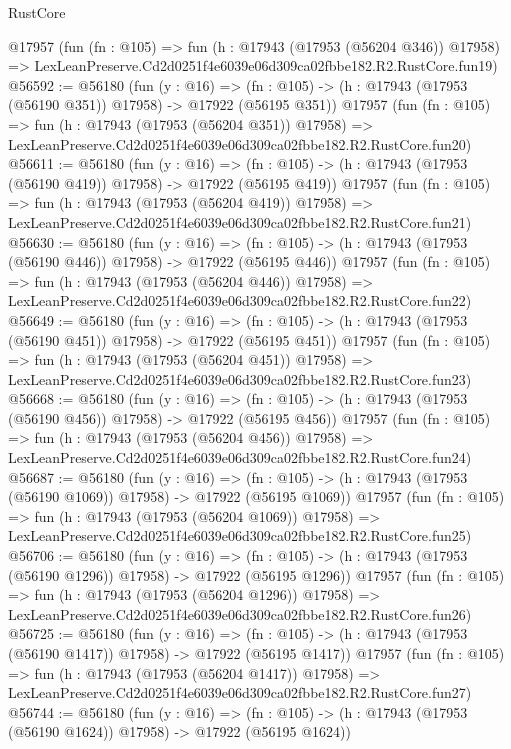 \begin{lexlean}{RustCore}
\begin{coremodule}
    @17957
    (fun (fn : @105) =>
    fun (h : @17943 (@17953 (@56204 @346)) @17958) =>
    LexLeanPreserve.Cd2d0251f4e6039e06d309ca02fbbe182.R2.RustCore.fun19)
@56592 := @56180
    (fun (y : @16) =>
    (fn : @105) -> (h : @17943 (@17953 (@56190 @351)) @17958) -> @17922 (@56195 @351))
    @17957
    (fun (fn : @105) =>
    fun (h : @17943 (@17953 (@56204 @351)) @17958) =>
    LexLeanPreserve.Cd2d0251f4e6039e06d309ca02fbbe182.R2.RustCore.fun20)
@56611 := @56180
    (fun (y : @16) =>
    (fn : @105) -> (h : @17943 (@17953 (@56190 @419)) @17958) -> @17922 (@56195 @419))
    @17957
    (fun (fn : @105) =>
    fun (h : @17943 (@17953 (@56204 @419)) @17958) =>
    LexLeanPreserve.Cd2d0251f4e6039e06d309ca02fbbe182.R2.RustCore.fun21)
@56630 := @56180
    (fun (y : @16) =>
    (fn : @105) -> (h : @17943 (@17953 (@56190 @446)) @17958) -> @17922 (@56195 @446))
    @17957
    (fun (fn : @105) =>
    fun (h : @17943 (@17953 (@56204 @446)) @17958) =>
    LexLeanPreserve.Cd2d0251f4e6039e06d309ca02fbbe182.R2.RustCore.fun22)
@56649 := @56180
    (fun (y : @16) =>
    (fn : @105) -> (h : @17943 (@17953 (@56190 @451)) @17958) -> @17922 (@56195 @451))
    @17957
    (fun (fn : @105) =>
    fun (h : @17943 (@17953 (@56204 @451)) @17958) =>
    LexLeanPreserve.Cd2d0251f4e6039e06d309ca02fbbe182.R2.RustCore.fun23)
@56668 := @56180
    (fun (y : @16) =>
    (fn : @105) -> (h : @17943 (@17953 (@56190 @456)) @17958) -> @17922 (@56195 @456))
    @17957
    (fun (fn : @105) =>
    fun (h : @17943 (@17953 (@56204 @456)) @17958) =>
    LexLeanPreserve.Cd2d0251f4e6039e06d309ca02fbbe182.R2.RustCore.fun24)
@56687 := @56180
    (fun (y : @16) =>
    (fn : @105) -> (h : @17943 (@17953 (@56190 @1069)) @17958) -> @17922 (@56195 @1069))
    @17957
    (fun (fn : @105) =>
    fun (h : @17943 (@17953 (@56204 @1069)) @17958) =>
    LexLeanPreserve.Cd2d0251f4e6039e06d309ca02fbbe182.R2.RustCore.fun25)
@56706 := @56180
    (fun (y : @16) =>
    (fn : @105) -> (h : @17943 (@17953 (@56190 @1296)) @17958) -> @17922 (@56195 @1296))
    @17957
    (fun (fn : @105) =>
    fun (h : @17943 (@17953 (@56204 @1296)) @17958) =>
    LexLeanPreserve.Cd2d0251f4e6039e06d309ca02fbbe182.R2.RustCore.fun26)
@56725 := @56180
    (fun (y : @16) =>
    (fn : @105) -> (h : @17943 (@17953 (@56190 @1417)) @17958) -> @17922 (@56195 @1417))
    @17957
    (fun (fn : @105) =>
    fun (h : @17943 (@17953 (@56204 @1417)) @17958) =>
    LexLeanPreserve.Cd2d0251f4e6039e06d309ca02fbbe182.R2.RustCore.fun27)
@56744 := @56180
    (fun (y : @16) =>
    (fn : @105) -> (h : @17943 (@17953 (@56190 @1624)) @17958) -> @17922 (@56195 @1624))

\end{coremodule}
\end{lexlean}
